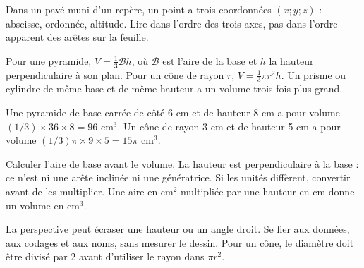 \begin{definition}Dans un pavé muni d’un repère, un point a trois coordonnées $(x;y;z)$ : abscisse, ordonnée, altitude. Lire dans l’ordre des trois axes, pas dans l’ordre apparent des arêtes sur la feuille.\end{definition}
\clearpage
{}\label{cours-17-2}
\begin{propriete}Pour une pyramide, $V=\frac13\mathcal B h$, où $\mathcal B$ est l’aire de la base et $h$ la hauteur perpendiculaire à son plan. Pour un cône de rayon $r$, $V=\frac13\pi r^2h$. Un prisme ou cylindre de même base et de même hauteur a un volume trois fois plus grand.\end{propriete}
\begin{exemple}Une pyramide de base carrée de côté 6 cm et de hauteur 8 cm a pour volume $(1/3)\times36\times8=96$ cm$^3$. Un cône de rayon 3 cm et de hauteur 5 cm a pour volume $(1/3)\pi\times9\times5=15\pi$ cm$^3$.\end{exemple}
\begin{savoirfaire}Calculer l’aire de base avant le volume. La hauteur est perpendiculaire à la base : ce n’est ni une arête inclinée ni une génératrice. Si les unités diffèrent, convertir avant de les multiplier. Une aire en cm$^2$ multipliée par une hauteur en cm donne un volume en cm$^3$.\end{savoirfaire}
\begin{attention}La perspective peut écraser une hauteur ou un angle droit. Se fier aux données, aux codages et aux noms, sans mesurer le dessin. Pour un cône, le diamètre doit être divisé par 2 avant d’utiliser le rayon dans $\pi r^2$.\end{attention}

